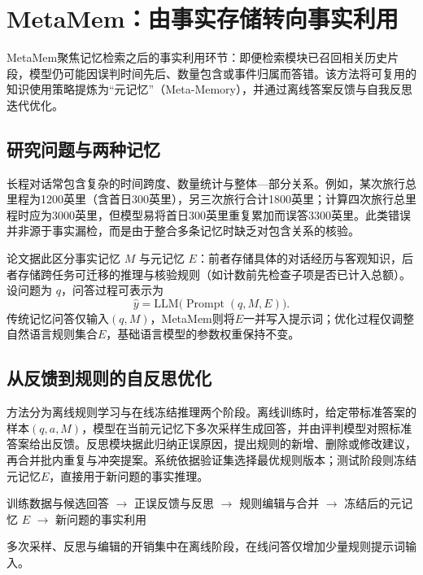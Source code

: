 \section{MetaMem：由事实存储转向事实利用}
\label{sec:metamem}

MetaMem聚焦记忆检索之后的事实利用环节：即便检索模块已召回相关历史片段，模型仍可能因误判时间先后、数量包含或事件归属而答错。该方法将可复用的知识使用策略提炼为“元记忆”（Meta-Memory），并通过离线答案反馈与自我反思迭代优化。

\subsection{研究问题与两种记忆}

长程对话常包含复杂的时间跨度、数量统计与整体—部分关系。例如，某次旅行总里程为1200英里（含首日300英里），另三次旅行合计1800英里；计算四次旅行总里程时应为3000英里，但模型易将首日300英里重复累加而误答3300英里。此类错误并非源于事实漏检，而是由于整合多条记忆时缺乏对包含关系的核验。

论文据此区分事实记忆 $M$ 与元记忆 $E$：前者存储具体的对话经历与客观知识，后者存储跨任务可迁移的推理与核验规则（如计数前先检查子项是否已计入总额）。设问题为 $q$，问答过程可表示为
\begin{equation}
\hat y=\mathrm{LLM}\bigl(\operatorname{Prompt}(q,M,E)\bigr).
\end{equation}
传统记忆问答仅输入$(q,M)$，MetaMem则将$E$一并写入提示词；优化过程仅调整自然语言规则集合$E$，基础语言模型的参数权重保持不变。

\subsection{从反馈到规则的自反思优化}

方法分为离线规则学习与在线冻结推理两个阶段。离线训练时，给定带标准答案的样本$(q,a,M)$，模型在当前元记忆下多次采样生成回答，并由评判模型对照标准答案给出反馈。反思模块据此归纳正误原因，提出规则的新增、删除或修改建议，再合并批内重复与冲突提案。系统依据验证集选择最优规则版本；测试阶段则冻结元记忆$E$，直接用于新问题的事实推理。

\begin{center}
\small
训练数据与候选回答 $\longrightarrow$ 正误反馈与反思 $\longrightarrow$ 规则编辑与合并
$\longrightarrow$ 冻结后的元记忆 $E$ $\longrightarrow$ 新问题的事实利用
\end{center}

多次采样、反思与编辑的开销集中在离线阶段，在线问答仅增加少量规则提示词输入。

